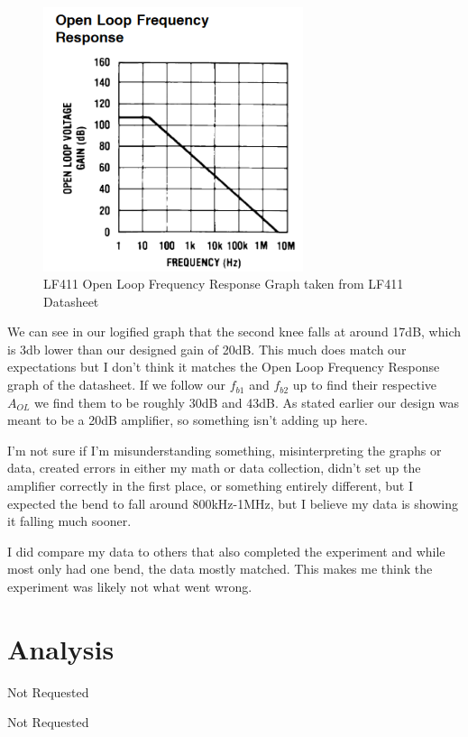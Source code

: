 \documentclass[prb,preprint]{revtex4-1}
\begin{document}
\begin{figure}[ht]
	\centering
	\includegraphics[width=3in]{datasheetBode.png}
	\caption{LF411 Open Loop Frequency Response Graph taken from LF411 Datasheet}
	\label{fig1}
\end{figure}

We can see in our logified graph that the second knee falls at around 17dB, which is 3db lower than our designed gain of 20dB. This much does match our expectations but I don't think it matches the Open Loop Frequency Response graph of the datasheet. If we follow our $f_{b1}$ and $f_{b2}$ up to find their respective $A_{OL}$ we find them to be roughly 30dB and 43dB. As stated earlier our design was meant to be a 20dB amplifier, so something isn't adding up here.

I'm not sure if I'm misunderstanding something, misinterpreting the graphs or data, created errors in either my math or data collection, didn't set up the amplifier correctly in the first place, or something entirely different, but I expected the bend to fall around 800kHz-1MHz, but I believe my data is showing it falling much sooner.

I did compare my data to others that also completed the experiment and while most only had one bend, the data mostly matched. This makes me think the experiment was likely not what went wrong.

\section{Analysis}
Not Requested

\begin{thebibliography}{99}
Not Requested
\end{thebibliography}
\end{document}
